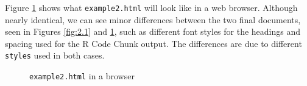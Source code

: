 \documentclass[a4paper, 12pt]{report}
\begin{document}
Figure \ref{fig:3.1} shows what \texttt{example2.html} will look like in a web browser. Although nearly identical, we can see minor differences between the two final documents, seen in Figures \ref{fig:2.1} and \ref{fig:3.1}, such as different font styles for the headings and spacing used for the R Code Chunk output. The differences are due to different \texttt{styles} used in both cases.
\begin{figure}[h!]
\caption{\texttt{example2.html} in a browser}
\label{fig:3.1}
\end{figure}



\newpage
\end{document}
